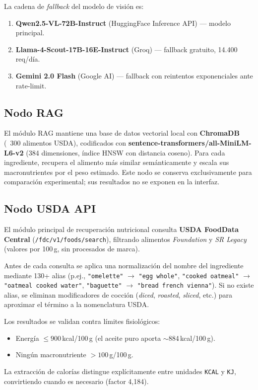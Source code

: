 \documentclass[10pt,a4paper]{article}
\begin{document}
La cadena de \textit{fallback} del modelo de visión es:
\begin{enumerate}[noitemsep, topsep=2pt]
  \item \textbf{Qwen2.5-VL-72B-Instruct} (HuggingFace Inference API) — modelo principal.
  \item \textbf{Llama-4-Scout-17B-16E-Instruct} (Groq) — fallback gratuito, 14.400 req/día.
  \item \textbf{Gemini 2.0 Flash} (Google AI) — fallback con reintentos exponenciales ante rate-limit.
\end{enumerate}

\subsection{Nodo RAG}

El módulo RAG mantiene una base de datos vectorial local con \textbf{ChromaDB} (~300 alimentos
USDA), codificados con \textbf{sentence-transformers/all-MiniLM-L6-v2} (384 dimensiones, índice
HNSW con distancia coseno). Para cada ingrediente, recupera el alimento más similar
semánticamente y escala sus macronutrientes por el peso estimado. Este nodo se conserva
exclusivamente para comparación experimental; sus resultados no se exponen en la interfaz.

\subsection{Nodo USDA API}

El módulo principal de recuperación nutricional consulta \textbf{USDA FoodData Central}
(\texttt{/fdc/v1/foods/search}), filtrando alimentos \textit{Foundation} y \textit{SR Legacy}
(valores por 100\,g, sin procesados de marca).

Antes de cada consulta se aplica una normalización del nombre del ingrediente mediante 130+ alias
(p.ej., \texttt{"omelette"} $\to$ \texttt{"egg whole"}, \texttt{"cooked oatmeal"} $\to$
\texttt{"oatmeal cooked water"}, \texttt{"baguette"} $\to$ \texttt{"bread french vienna"}). Si no
existe alias, se eliminan modificadores de cocción (\textit{diced}, \textit{roasted}, \textit{sliced},
etc.) para aproximar el término a la nomenclatura USDA.

Los resultados se validan contra límites fisiológicos:
\begin{itemize}[noitemsep, topsep=2pt]
  \item Energía $\leq 900$\,kcal/100\,g (el aceite puro aporta $\sim$884\,kcal/100\,g).
  \item Ningún macronutriente $> 100$\,g/100\,g.
\end{itemize}
La extracción de calorías distingue explícitamente entre unidades \texttt{KCAL} y \texttt{KJ},
convirtiendo cuando es necesario (factor 4,184).
\end{document}
